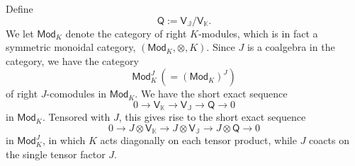 \documentclass[11pt, a4paper]{amsart}
\theoremstyle{definition}
\numberwithin{equation}{section}
\begin{document}
Define
\begin{equation}\label{E40b}
\mathsf{Q} := \mathsf{V}_{\mathbb{J}} / \mathsf{V}_{\mathbb{K}}. 
\end{equation}
We let $\mathsf{Mod}_{K}$ denote the category of right $K$-modules, which is in fact a symmetric 
monoidal category, $(\mathsf{Mod}_{K}, \otimes, K)$. Since $J$ is a coalgebra in the category, we have
the category
\begin{equation}\label{E40c}
\mathsf{Mod}_{K}^{J}\, (= (\mathsf{Mod}_{K})^{J}) 
\end{equation}
of right $J$-comodules in $\mathsf{Mod}_{K}$. 
We have the short exact sequence
\[ 0 \to \mathsf{V}_{\mathbb{K}} \to \mathsf{V}_{\mathbb{J}} \to \mathsf{Q} \to 0 \]
in $\mathsf{Mod}_{K}$. Tensored with $J$, this gives rise to the short exact sequence
\begin{equation}\label{E41}
0 \to J \otimes \mathsf{V}_{\mathbb{K}} \to J \otimes \mathsf{V}_{\mathbb{J}} \to J \otimes \mathsf{Q} \to 0
\end{equation}
in $\mathsf{Mod}_{K}^{J}$, in which
$K$ acts diagonally on each tensor product, while $J$ coacts on the single tensor factor $J$.
\end{document}
